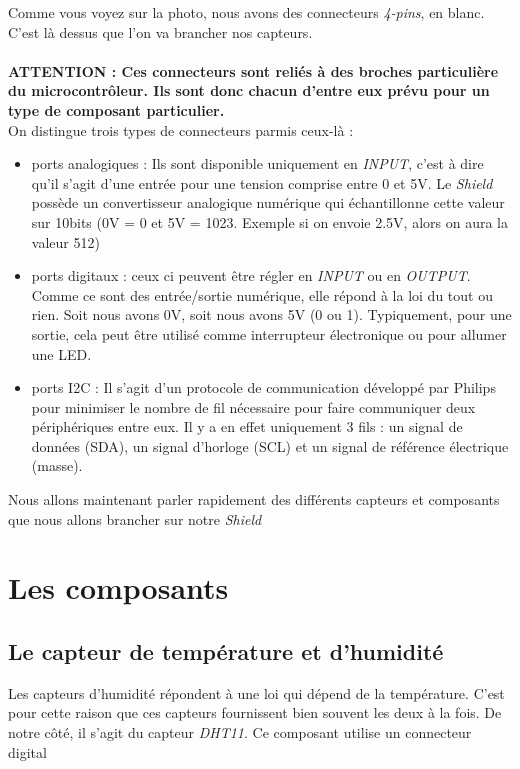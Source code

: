 Comme vous voyez sur la photo, nous avons des connecteurs \textit{4-pins}, en blanc. C'est là dessus que l'on va brancher nos capteurs.\\
\\
\textbf{ATTENTION : Ces connecteurs sont reliés à des broches particulière du microcontrôleur. Ils sont donc chacun d'entre eux prévu pour un type de composant particulier. } \\

On distingue trois types de connecteurs parmis ceux-là :

\begin{itemize}
	\item ports analogiques : Ils sont disponible uniquement en \textit{INPUT}, c'est à dire qu'il s'agit d'une entrée pour une tension comprise entre 0 et 5V. Le \textit{Shield} possède un convertisseur analogique numérique qui échantillonne cette valeur sur 10bits (0V = 0 et 5V = 1023. Exemple si on envoie 2.5V, alors on aura la valeur 512)
	
	\item ports digitaux : ceux ci peuvent être régler en \textit{INPUT} ou en \textit{OUTPUT}. Comme ce sont des entrée/sortie numérique, elle répond à la loi du tout ou rien. Soit nous avons 0V, soit nous avons 5V (0 ou 1). Typiquement, pour une sortie, cela peut être utilisé comme interrupteur électronique ou pour allumer une LED.
	\item ports I2C : Il s'agit d'un protocole de communication développé par Philips pour minimiser le nombre de fil nécessaire pour faire communiquer deux périphériques entre eux. Il y a en effet uniquement 3 fils : un signal de données (SDA), un signal d'horloge (SCL) et un signal de référence électrique (masse).
\end{itemize}

Nous allons maintenant parler rapidement des différents capteurs et composants que nous allons brancher sur notre \textit{Shield}

\section{Les composants}

\subsection{Le capteur de température et d'humidité}

Les capteurs d'humidité répondent à une loi qui dépend de la température. C'est pour cette raison que ces capteurs fournissent bien souvent les deux à la fois. De notre côté, il s'agit du capteur \textit{DHT11}. Ce composant utilise un connecteur digital\\

